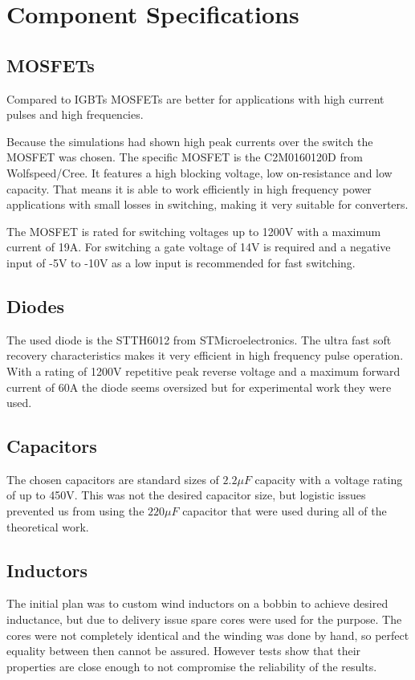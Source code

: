 \section{Component Specifications}\label{ch:compSpec}

\subsection{MOSFETs}
Compared to IGBTs MOSFETs are better for applications with high current pulses and high frequencies.\cite{igbtelec63:online}

Because the simulations had shown high peak currents over the switch the MOSFET was chosen.
The specific MOSFET is the C2M0160120D from Wolfspeed/Cree. 
It features a high blocking voltage, low on-resistance and low capacity.
That means it is able to work efficiently in high frequency power applications with small losses in switching, making it very suitable for converters.

The MOSFET is rated for switching voltages up to 1200V with a maximum current of 19A.
For switching a gate voltage of 14V is required and a negative input of -5V to -10V as a low input is recommended for fast switching.\cite{CreeC2M082:online}

\subsection{Diodes}
The used diode is the STTH6012 from STMicroelectronics.
The ultra fast soft recovery characteristics makes it very efficient in high frequency pulse operation.
With a rating of 1200V repetitive peak reverse voltage and a maximum forward current of 60A the diode seems oversized but for experimental work they were used.\cite{ST}
\subsection{Capacitors}
The chosen capacitors are standard sizes of $2.2 \mu F$ capacity with a voltage rating of up to 450V. This was not the desired capacitor size, but logistic issues prevented us from using the $220 \mu F$ capacitor that were used during all of the theoretical work.

\subsection{Inductors}
The initial plan was to custom wind inductors on a bobbin to achieve desired inductance, but due to delivery issue spare cores were used for the purpose. The cores were not completely identical and the winding was done by hand, so perfect equality between then cannot be assured. However tests show that their properties are close enough to not compromise the reliability of the results. 
